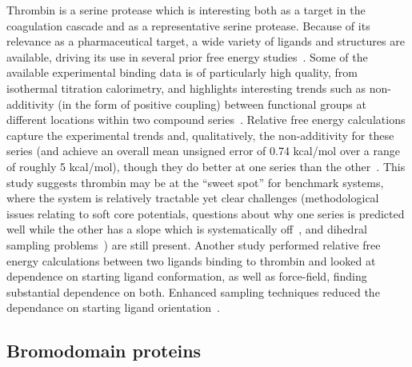 \documentclass[aps,pre,twocolumn,nofootinbib,superscriptaddress,10pt, final,tightenlines]{revtex4-1}
\begin{document}
Thrombin is a serine protease which is interesting both as a target in the coagulation cascade and as a representative serine protease. 
Because of its relevance as a pharmaceutical target, a wide variety of ligands and structures are available, driving its use in several prior free energy studies~\cite{wang_achieving_2012, schrodinger_accurate_2015, calabro_elucidation_2016}. 
Some of the available experimental binding data is of particularly high quality, from isothermal titration calorimetry, and highlights interesting trends such as non-additivity (in the form of positive coupling) between functional groups at different locations within two compound series~\cite{baum_non-additivity_2010, calabro_elucidation_2016}. 
Relative free energy calculations capture the experimental trends and, qualitatively, the non-additivity for these series (and achieve an overall mean unsigned error of 0.74 kcal/mol over a range of roughly 5 kcal/mol), though they do better at one series than the other~\cite{calabro_elucidation_2016}. 
This study suggests thrombin may be at the ``sweet spot'' for benchmark systems, where the system is relatively tractable yet clear challenges (methodological issues relating to soft core potentials, questions about why one series is predicted well while the other has a slope which is systematically off~\cite{calabro_elucidation_2016}, and dihedral sampling problems~\cite{calabro_accelerating_2015}) are still present. 
Another study performed relative free energy calculations between two ligands binding to thrombin and looked at dependence on starting ligand conformation, as well as force-field, finding substantial dependence on both. 
Enhanced sampling techniques reduced the dependance on starting ligand orientation~\cite{wang_achieving_2012}.


\subsection{Bromodomain proteins}
\end{document}

